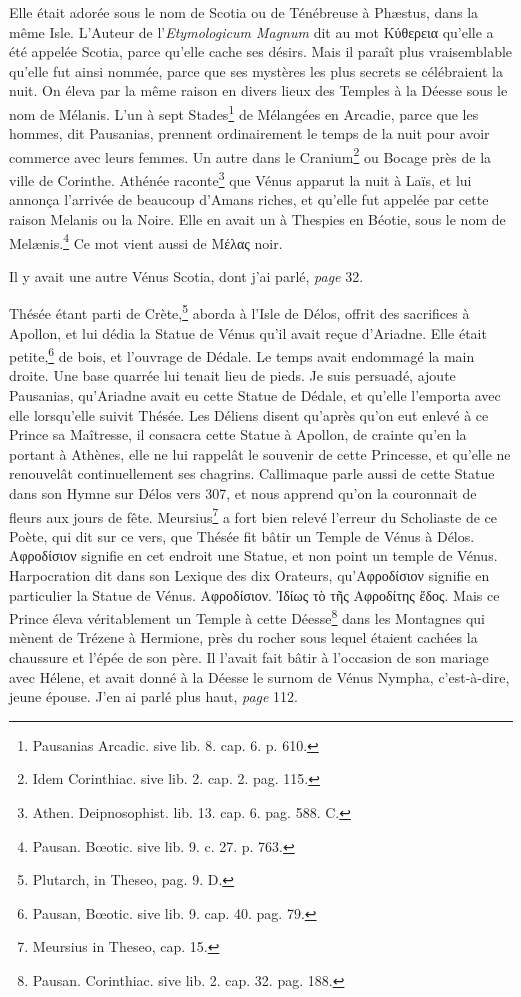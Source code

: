 \documentclass[a4paper, 11pt, oneside, polutonikogreek, french]{article}
\begin{document}
Elle était adorée sous le nom de Scotia ou de Ténébreuse à Phæstus, dans la même Isle. L'Auteur de l'\emph{Etymologicum Magnum} dit au mot Κύθερεια qu'elle a été appelée Scotia, parce qu'elle cache ses désirs. Mais il paraît plus vraisemblable qu'elle fut ainsi nommée, parce que ses mystères les plus secrets se célébraient la nuit. On éleva par la même raison en divers lieux des Temples à la Déesse sous le nom de Mélanis. L'un à sept Stades\footnote{Pausanias Arcadic. sive lib. 8. cap. 6. p. 610.} de Mélangées en Arcadie, parce que les hommes, dit Pausanias, prennent ordinairement le temps de la nuit pour avoir commerce avec leurs femmes. Un autre dans le Cranium\footnote{Idem Corinthiac. sive lib. 2. cap. 2. pag. 115.} ou Bocage près de la ville de Corinthe. Athénée raconte\footnote{Athen. Deipnosophist. lib. 13. cap. 6. pag. 588. C.} que Vénus apparut la nuit à Laïs, et lui annonça l'arrivée de beaucoup d'Amans riches, et qu'elle fut appelée par cette raison Melanis ou la Noire. Elle en avait un à Thespies en Béotie, sous le nom de Melænis.\footnote{Pausan. Bœotic. sive lib. 9. c. 27. p. 763.} Ce mot vient aussi de Μέλας noir.

Il y avait une autre Vénus Scotia, dont j'ai parlé, \emph{page} 32.

Thésée étant parti de Crète,\footnote{Plutarch, in Theseo, pag. 9. D.} aborda à l'Isle de Délos, offrit des sacrifices à Apollon, et lui dédia la Statue de Vénus qu'il avait reçue d'Ariadne. Elle était petite,\footnote{Pausan, Bœotic. sive lib. 9. cap. 40. pag. 79.} de bois, et l'ouvrage de Dédale. Le temps avait endommagé la main droite. Une base quarrée lui tenait lieu de pieds. Je suis persuadé, ajoute Pausanias, qu'Ariadne avait eu cette Statue de Dédale, et qu'elle l'emporta avec elle lorsqu'elle suivit Thésée. Les Déliens disent qu'après qu'on eut enlevé à ce Prince sa Maîtresse, il consacra cette Statue à Apollon, de crainte qu'en la portant à Athènes, elle ne lui rappelât le souvenir de cette Princesse, et qu'elle ne renouvelât continuellement ses chagrins. Callimaque parle aussi de cette Statue dans son Hymne sur Délos vers 307, et nous apprend qu'on la couronnait de fleurs aux jours de fête. Meursius\footnote{Meursius in Theseo, cap. 15.} a fort bien relevé l'erreur du Scholiaste de ce Poète, qui dit sur ce vers, que Thésée fit bâtir un Temple de Vénus à Délos. Αφροδίσιον signifie en cet endroit une Statue, et non point un temple de Vénus. Harpocration dit dans son Lexique des dix Orateurs, qu'Αφροδίσιον signifie en particulier la Statue de Vénus. Αφροδίσιον. Ἰδίως τὸ τῆς Αφροδίτης ἕδος. Mais ce Prince éleva véritablement un Temple à cette Déesse\footnote{Pausan. Corinthiac. sive lib. 2. cap. 32. pag. 188.} dans les Montagnes qui mènent de Trézene à Hermione, près du rocher sous lequel étaient cachées la chaussure et l'épée de son père. Il l'avait fait bâtir à l'occasion de son mariage avec Hélene, et avait donné à la Déesse le surnom de Vénus Nympha, c'est-à-dire, jeune épouse. J'en ai parlé plus haut, \emph{page} 112.
\end{document}
